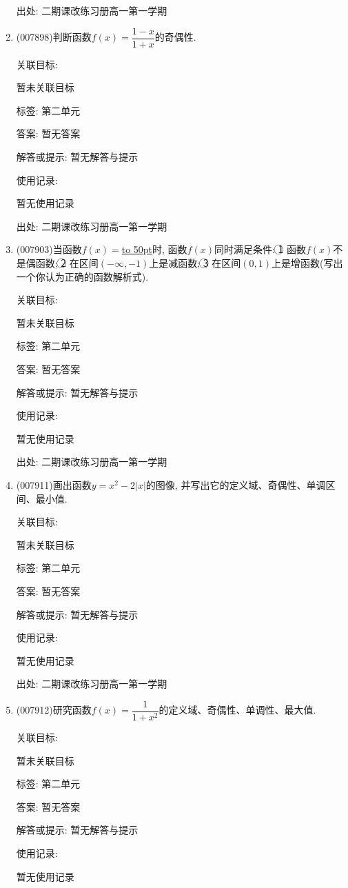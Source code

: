 \documentclass[10pt,a4paper]{article}
\newcommand{\blank}[1]{\underline{\hbox to #1pt{}}}
\begin{document}
\begin{enumerate}[1.]
出处: 二期课改练习册高一第一学期
\item { (007898)}判断函数$f(x)=\dfrac{1-x}{1+x}$的奇偶性.


关联目标:

暂未关联目标



标签: 第二单元

答案: 暂无答案

解答或提示: 暂无解答与提示

使用记录:

暂无使用记录


出处: 二期课改练习册高一第一学期
\item { (007903)}当函数$f(x)=$\blank{50}时, 函数$f(x)$同时满足条件: \textcircled{1} 函数$f(x)$不是偶函数; \textcircled{2} 在区间$(-\infty ,-1)$上是减函数; \textcircled{3} 在区间$(0,1)$上是增函数(写出一个你认为正确的函数解析式).


关联目标:

暂未关联目标



标签: 第二单元

答案: 暂无答案

解答或提示: 暂无解答与提示

使用记录:

暂无使用记录


出处: 二期课改练习册高一第一学期
\item { (007911)}画出函数$y=x^2-2|x|$的图像, 并写出它的定义域、奇偶性、单调区间、最小值.


关联目标:

暂未关联目标



标签: 第二单元

答案: 暂无答案

解答或提示: 暂无解答与提示

使用记录:

暂无使用记录


出处: 二期课改练习册高一第一学期
\item { (007912)}研究函数$f(x)=\dfrac 1{1+x^2}$的定义域、奇偶性、单调性、最大值.


关联目标:

暂未关联目标



标签: 第二单元

答案: 暂无答案

解答或提示: 暂无解答与提示

使用记录:

暂无使用记录



\end{enumerate}
\end{document}
